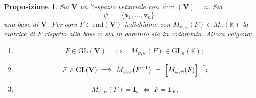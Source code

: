 \documentclass{article}
\theoremstyle{plain}
\newtheorem{prop}[thm]{Proposizione}
\theoremstyle{definition}
\theoremstyle{remark}
\begin{document}
\begin{bxthm}
\begin{prop}\label{prop:matrice-invertibile}
Sia \(\mathbf{V}\) un \(\mathbb{K}\)-spazio vettoriale con \(\dim(\mathbf{V})=n\). Sia 
\[
  \psi \;=\; \{\mathbf{v}_1,\dots,\mathbf{v}_n\}
\]
una base di \(\mathbf{V}\). Per ogni $F\in\mathrm{end}(\mathbf{V})$ indichiamo con \(M_{\psi,\psi}(F)\in M_n(\mathbb{K})\) la matrice di \(F\) rispetto alla base \(\psi\) sia in dominio sia in codominio. 
Allora valgono:

\begin{enumerate}
  \item \[
    F \in \mathrm{GL}(\mathbf{V})
    \quad\Longleftrightarrow\quad
    M_{\psi,\psi}(F) \in \mathrm{GL}_n(\mathbb{K});
  \]
  \item 
    \[ F\in \mathrm{GL}(\mathbf{V})\implies
      M_{\psi,\psi}\bigl(F^{-1}\bigr)
      \;=\;
      \Bigl[M_{\psi,\psi}(F)\Bigr]^{-1};
    \]
  \item \[
    M_{\psi,\psi}(F) = \mathbf{I}_n 
    \;\Longleftrightarrow\;
    F = \mathbf{1_V}.
  \]
\end{enumerate}
\end{prop}
\end{bxthm}
\end{document}
